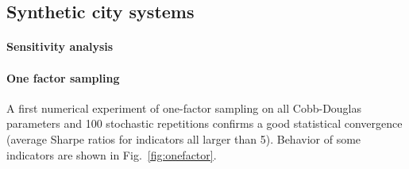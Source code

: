 \documentclass[11pt]{article}
\begin{document}


\subsection{Synthetic city systems}

\paragraph{Sensitivity analysis}


\paragraph{One factor sampling}

A first numerical experiment of one-factor sampling on all Cobb-Douglas parameters and 100 stochastic repetitions confirms a good statistical convergence (average Sharpe ratios for indicators all larger than 5). Behavior of some indicators are shown in Fig.~\ref{fig:onefactor}.
\end{document}
